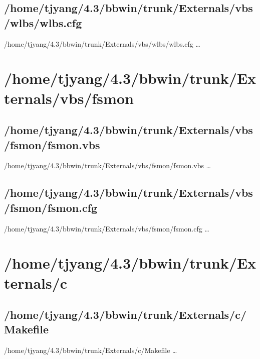 \subsection{/home/tjyang/4.3/bbwin/trunk/Externals/vbs/wlbs/wlbs.cfg}
\lstset{numberstyle=\tiny,numbers=left,
   breaklines=true,
   stepnumber=1,numbersep=5pt,firstnumber=1,
   xleftmargin=12pt,showstringspaces=false}
\noindent /home/tjyang/4.3/bbwin/trunk/Externals/vbs/wlbs/wlbs.cfg  \ldots



\section{/home/tjyang/4.3/bbwin/trunk/Externals/vbs/fsmon}

\subsection{/home/tjyang/4.3/bbwin/trunk/Externals/vbs/fsmon/fsmon.vbs}
\lstset{numberstyle=\tiny,numbers=left,
   breaklines=true,
   stepnumber=1,numbersep=5pt,firstnumber=1,
   xleftmargin=12pt,showstringspaces=false}
\noindent /home/tjyang/4.3/bbwin/trunk/Externals/vbs/fsmon/fsmon.vbs  \ldots



\subsection{/home/tjyang/4.3/bbwin/trunk/Externals/vbs/fsmon/fsmon.cfg}
\lstset{numberstyle=\tiny,numbers=left,
   breaklines=true,
   stepnumber=1,numbersep=5pt,firstnumber=1,
   xleftmargin=12pt,showstringspaces=false}
\noindent /home/tjyang/4.3/bbwin/trunk/Externals/vbs/fsmon/fsmon.cfg  \ldots



\section{/home/tjyang/4.3/bbwin/trunk/Externals/c}

\subsection{/home/tjyang/4.3/bbwin/trunk/Externals/c/Makefile}
\lstset{numberstyle=\tiny,numbers=left,
   breaklines=true,
   stepnumber=1,numbersep=5pt,firstnumber=1,
   xleftmargin=12pt,showstringspaces=false}
\noindent /home/tjyang/4.3/bbwin/trunk/Externals/c/Makefile  \ldots



